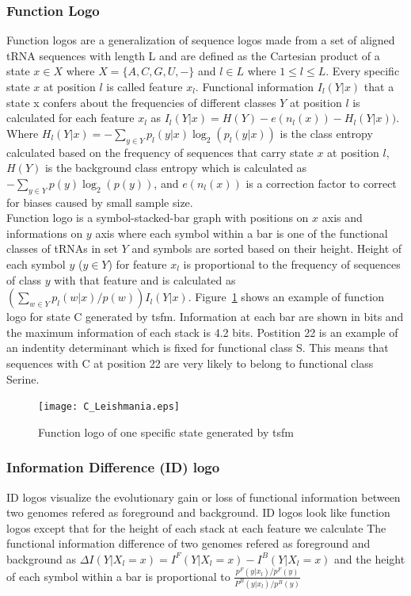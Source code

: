 \documentclass[
10pt, %
a4paper, %
oneside, %
headinclude,footinclude, %
BCOR5mm, %
]{scrartcl}
\begin{document}
\subsubsection*{\textbf{Function Logo}}
Function logos \cite{Freyhult2006VisualizingBT} are a generalization of sequence logos \cite{Schneider} made from a set of aligned tRNA sequences with length L and are defined as the Cartesian product of a state $x \in X$ where $X = \{A, C, G, U, - \}$ and $l \in L$ where $1 \leqslant l \leqslant L$. Every specific state $x$ at position $l$ is called feature $x_l$. Functional information $I_l(Y|x)$ that a state x confers about the frequencies of different classes $Y$ at position $l$ is calculated for each feature $x_l$ as  $I_l(Y|x)=H(Y)-e(n_l(x))-H_l(Y|x))$. Where $H_l(Y|x)=-\sum_{y \in Y} p_l(y|x)\log_2(p_l(y|x))$ is the class entropy calculated based on the frequency of sequences that carry state $x$ at position $l$, $H(Y)$ is the background class entropy which is calculated as $-\sum_{y \in Y} p(y)\log_2(p(y))$, and $e(n_l(x))$ is a correction factor to correct for biases caused by small sample size. \\
Function logo is a symbol-stacked-bar graph with positions on $x$ axis and informations on $y$ axis where each symbol within a bar is one of the functional classes of tRNAs in set $Y$ and symbols are sorted based on their height. Height of each symbol $y$ ($y \in Y$) for feature $x_l$ is proportional to the frequency of sequences of class $y$ with that feature and is calculated as $(\sum_{w \in Y} p_l(w|x)/p(w)) I_l(Y|x)$. Figure~\ref{fig:Flogo} shows an example of function logo for state C generated by tsfm. Information at each bar are shown in bits and the maximum information of each stack is 4.2 bits. Postition 22 is an example of an indentity determinant which is fixed for functional class S. This means that sequences with C at position 22 are very likely to belong to functional class Serine. 

\begin{figure}[H]
\centering 
\texttt{[image: C\_Leishmania.eps]} 
\caption[]{Function logo of one specific state generated by tsfm}
\label{fig:Flogo} 
\end{figure}


\subsubsection*{\textbf{Information Difference (ID) logo}}
ID logos \cite{FREYHULT20071276} visualize the evolutionary gain or loss of functional information between two genomes refered as foreground and background. ID logos look like function logos except that for the height of each stack at each feature we calculate The functional information difference of two genomes refered as foreground and background as $\Delta I(Y|X_l=x)=I^F(Y|X_l=x)-I^B(Y|X_l=x)$ and the height of each symbol within a bar is proportional to $\frac{p^F(y|x_l)/p^F(y)}{P^B(y|x_l)/p^B(y)}$
\end{document}
